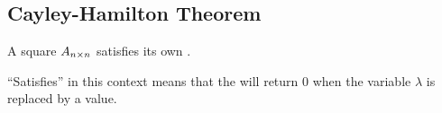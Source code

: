 \subsection{Cayley-Hamilton Theorem}\label{subsec:Cayley-Hamilton_Theorem}
\begin{theorem}\label{thm:Cayley-Hamilton_Theorem}
  A square  $A_{n \times n}$ satisfies its own .
  \begin{remark*}
    ``Satisfies'' in this context means that the  will return $0$ when the variable $\lambda$ is replaced by a value.
  \end{remark*}
\end{theorem}


